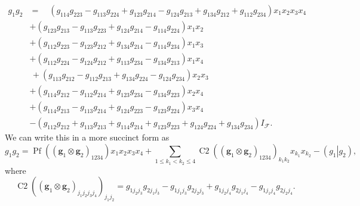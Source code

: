 \documentclass[aps,preprint]{revtex4}%
\begin{document}
\begin{align}
g_{1}g_{2}  &  =\quad\left(  \mathit{g}_{114}\mathit{g}_{223}-\mathit{g}%
_{113}\mathit{g}_{224}+\mathit{g}_{123}\mathit{g}_{214}-\mathit{g}%
_{124}\mathit{g}_{213}+\mathit{g}_{134}\mathit{g}_{212}+\mathit{g}%
_{112}\mathit{g}_{234}\right)  x_{1}x_{2}x_{3}x_{4}\\
&  +\left(  \mathit{g}_{123}\mathit{g}_{213}-\mathit{g}_{113}\mathit{g}%
_{223}+\mathit{g}_{124}\mathit{g}_{214}-\mathit{g}_{114}\mathit{g}%
_{224}\right)  x_{1}x_{2}\\
&  +\left(  \mathit{g}_{112}\mathit{g}_{223}-\mathit{g}_{123}\mathit{g}%
_{212}+\mathit{g}_{134}\mathit{g}_{214}-\mathit{g}_{114}\mathit{g}%
_{234}\right)  x_{1}x_{3}\\
&  +\left(  \mathit{g}_{112}\mathit{g}_{224}-\mathit{g}_{124}\mathit{g}%
_{212}+\mathit{g}_{113}\mathit{g}_{234}-\mathit{g}_{134}\mathit{g}%
_{213}\right)  x_{1}x_{4}\\
&  \,+\left(  \mathit{g}_{113}\mathit{g}_{212}-\mathit{g}_{112}\mathit{g}%
_{213}+\mathit{g}_{134}\mathit{g}_{224}-\mathit{g}_{124}\mathit{g}%
_{234}\right)  x_{2}x_{3}\\
&  +\left(  \mathit{g}_{114}\mathit{g}_{212}-\mathit{g}_{112}\mathit{g}%
_{214}+\mathit{g}_{123}\mathit{g}_{234}-\mathit{g}_{134}\mathit{g}%
_{223}\right)  x_{2}x_{4}\\
&  +\left(  \mathit{g}_{114}\mathit{g}_{213}-\mathit{g}_{113}\mathit{g}%
_{214}+\mathit{g}_{124}\mathit{g}_{223}-\mathit{g}_{123}\mathit{g}%
_{224}\right)  x_{3}x_{4}\\
&  -\left(  \mathit{g}_{112}\mathit{g}_{212}+\mathit{g}_{113}\mathit{g}%
_{213}+\mathit{g}_{114}\mathit{g}_{214}+\mathit{g}_{123}\mathit{g}%
_{223}+\mathit{g}_{124}\mathit{g}_{224}+\mathit{g}_{134}\mathit{g}%
_{234}\right)  I_{\mathcal{F}}.
\end{align}
We can write this in a more succinct form as
\begin{equation}
g_{1}g_{2}=\operatorname*{Pf}\left(  \left(  \mathbf{g}_{1}\otimes
\mathbf{g}_{2}\right)  _{1234}\right)  x_{1}x_{2}x_{3}x_{4}+\sum_{1\leq
k_{1}<k_{2}\leq4}\operatorname{C2}\left(  \left(  \mathbf{g}_{1}%
\otimes\mathbf{g}_{2}\right)  _{1234}\right)  _{k_{1}k_{2}}x_{k_{1}}x_{k_{2}%
}-\left(  \left.  g_{1}\right\vert g_{2}\right)  ,
\end{equation}
where
\begin{equation}
\operatorname{C2}\left(  \left(  \mathbf{g}_{1}\otimes\mathbf{g}_{2}\right)
_{j_{1}j_{2}j_{3}j_{4}}\right)  _{j_{1}j_{2}}=\mathit{g}_{1j_{2}j_{3}%
}\mathit{g}_{2j_{1}j_{3}}-\mathit{g}_{1j_{1}j_{3}}\mathit{g}_{2j_{2}j_{3}%
}+\mathit{g}_{1j_{2}j_{4}}\mathit{g}_{2j_{1}j_{4}}-\mathit{g}_{1j_{1}j_{4}%
}\mathit{g}_{2j_{2}j_{4}}.
\end{equation}
\end{document}

